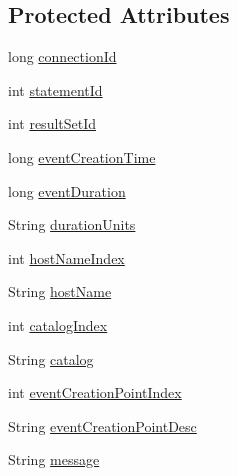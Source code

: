 \subsection*{Protected Attributes}
\begin{DoxyCompactItemize}
\item 
long \mbox{\hyperlink{classcom_1_1mysql_1_1cj_1_1log_1_1_profiler_event_impl_a264164abd2686e4a44131114156452d7}{connection\+Id}}
\item 
int \mbox{\hyperlink{classcom_1_1mysql_1_1cj_1_1log_1_1_profiler_event_impl_af16efdf6c64d552484266a63d97fd77d}{statement\+Id}}
\item 
int \mbox{\hyperlink{classcom_1_1mysql_1_1cj_1_1log_1_1_profiler_event_impl_a8827c310fa8083835fe1e9ff62a47a07}{result\+Set\+Id}}
\item 
long \mbox{\hyperlink{classcom_1_1mysql_1_1cj_1_1log_1_1_profiler_event_impl_adabab2102bc799a1e96b8dbe1fb86d51}{event\+Creation\+Time}}
\item 
long \mbox{\hyperlink{classcom_1_1mysql_1_1cj_1_1log_1_1_profiler_event_impl_af97edaeaff6563c834b1ea6262e53e5c}{event\+Duration}}
\item 
String \mbox{\hyperlink{classcom_1_1mysql_1_1cj_1_1log_1_1_profiler_event_impl_a850355145b304246e6b533a25a4dfe32}{duration\+Units}}
\item 
int \mbox{\hyperlink{classcom_1_1mysql_1_1cj_1_1log_1_1_profiler_event_impl_a4a7755757c30c2a9ed3d2a3a7981d94e}{host\+Name\+Index}}
\item 
String \mbox{\hyperlink{classcom_1_1mysql_1_1cj_1_1log_1_1_profiler_event_impl_aa8efa2a90b158d0fa4dfdc0e85a90f85}{host\+Name}}
\item 
int \mbox{\hyperlink{classcom_1_1mysql_1_1cj_1_1log_1_1_profiler_event_impl_a45592c6b128e58b0e59a38d6794ea608}{catalog\+Index}}
\item 
String \mbox{\hyperlink{classcom_1_1mysql_1_1cj_1_1log_1_1_profiler_event_impl_ad98c4eaf20d8287d3ffe0ce846c29176}{catalog}}
\item 
int \mbox{\hyperlink{classcom_1_1mysql_1_1cj_1_1log_1_1_profiler_event_impl_aeada8e16a4c0ad69e5079dd3149f3fe6}{event\+Creation\+Point\+Index}}
\item 
String \mbox{\hyperlink{classcom_1_1mysql_1_1cj_1_1log_1_1_profiler_event_impl_a42cbd6a7cb56109f08db67263beee178}{event\+Creation\+Point\+Desc}}
\item 
String \mbox{\hyperlink{classcom_1_1mysql_1_1cj_1_1log_1_1_profiler_event_impl_a0db7c3af48a3c0c71052ef2b495b9396}{message}}
\end{DoxyCompactItemize}
